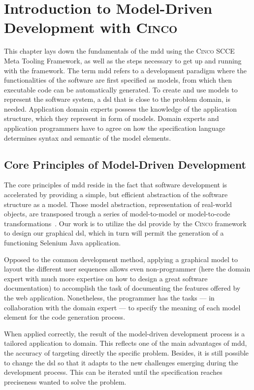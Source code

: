 
\chapter{Introduction to Model-Driven Development with \textsc{Cinco}}\label{ch:Basis}

This chapter lays down the fundamentals of the \acrfull{mdd} using the \textsc{Cinco} SCCE Meta Tooling Framework, as well as the steps necessary to get up and running with the framework. The term \acrshort{mdd} refers to a development paradigm where the functionalities of the software are first specified as models, from which then executable code can be automatically generated. To create and use models to represent the software system, a \acrfull{dsl} that is close to the problem domain, is needed. Application domain experts possess the knowledge of the application structure, which they represent in form of models. Domain experts and application programmers have to agree on how the specification language determines syntax and semantic of the model elements.

\section{Core Principles of Model-Driven Development}

The core principles of \acrfull{mdd} reside in the fact that software development is accelerated by providing a simple, but efficient abstraction of the software structure as a model. Those model abstraction, representation of real-world objects, are transposed trough a series of model-to-model or model-to-code transformations~\cite{stahl_et_al}. Our work is to utilize the \acrshort{dsl} provide by the \textsc{Cinco} framework to design our graphical \acrshort{dsl}, which in turn will permit the generation of a functioning \gls{Selenium} Java application.

Opposed to the common development method, applying a graphical model to layout the different user sequences allows even non-programmer (here the domain expert with much more expertise on how to design a great software documentation) to accomplish the task of documenting the features offered by the web application. Nonetheless, the programmer has the tasks --- in collaboration with the domain expert --- to specify the meaning of each model element for the code generation process.

When applied correctly, the result of the model-driven development process is a tailored application to domain. This reflects one of the main advantages of \acrshort{mdd}, the accuracy of targeting directly the specific problem. Besides, it is still possible to change the \acrshort{dsl} so that it adapts to the new challenges emerging during the development process. This can be iterated until the specification reaches preciseness wanted to solve the problem.

